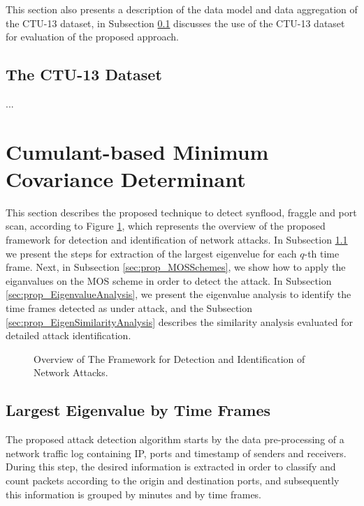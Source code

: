 \documentclass[review]{elsarticle}
\begin{document}
This section also presents a description of the data model and data aggregation of the CTU-13 dataset, in Subsection \ref{sec:CTU-13} discusses the use of the CTU-13 dataset for evaluation of the proposed approach.

\subsection{The CTU-13 Dataset}
\label{sec:CTU-13}

...

\section{Cumulant-based Minimum Covariance Determinant}
\label{sec:c_mcd}

This section describes the proposed technique to detect synflood, fraggle and port scan, according to Figure \ref{fig:fig80}, which represents the overview of the proposed framework for detection and identification of network attacks. In Subsection \ref{sec:prop_LargestEigenvaluebyTimeFrames} we present the steps for extraction of the largest eigenvelue for each $q$-th time frame. Next, in Subsection \ref{sec:prop_MOSSchemes}, we show how to apply the eiganvalues on the MOS scheme in order to detect the attack. In Subsection \ref{sec:prop_EigenvalueAnalysis}, we present the eigenvalue analysis to identify the time frames detected as under attack, and the Subsection \ref{sec:prop_EigenSimilarityAnalysis} describes the similarity analysis evaluated for detailed attack identification.

\begin{figure}[h!]
	\centering
     \caption{Overview of The Framework for Detection and Identification of Network Attacks.}
     \label{fig:fig80}
\end{figure}

\subsection{Largest Eigenvalue by Time Frames}
\label{sec:prop_LargestEigenvaluebyTimeFrames}

The proposed attack detection algorithm starts by the data pre-processing of a network traffic log containing IP, ports and timestamp of senders and receivers. During this step, the desired information is extracted in order to classify and count packets according to the origin and destination ports, and subsequently this information is grouped by minutes and by time frames.
\end{document}
